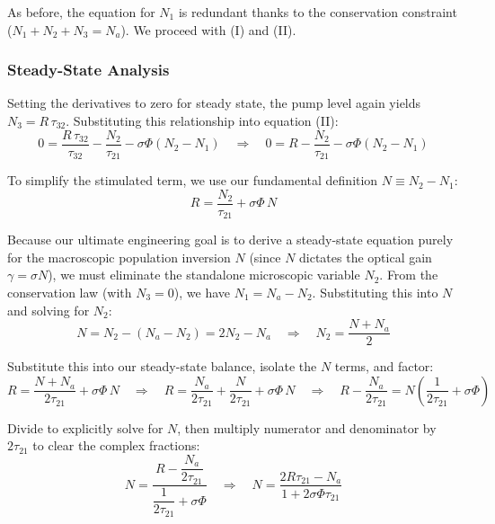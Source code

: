 As before, the equation for $N_1$ is redundant thanks to the conservation constraint ($N_1 + N_2 + N_3 = N_a$). We proceed with \textup{(I)} and \textup{(II)}.

\subsubsection*{Steady-State Analysis}

Setting the derivatives to zero for steady state, the pump level again yields $N_3 = R\,\tau_{32}$. Substituting this relationship into equation \textup{(II)}:
\begin{equation*}
    0 = \frac{R\,\tau_{32}}{\tau_{32}} - \frac{N_2}{\tau_{21}} - \sigma\Phi(N_2 - N_1) \quad \Longrightarrow \quad 0 = R - \frac{N_2}{\tau_{21}} - \sigma\Phi(N_2 - N_1)
\end{equation*}

To simplify the stimulated term, we use our fundamental definition $N \equiv N_2 - N_1$:
\begin{equation*}
    R = \frac{N_2}{\tau_{21}} + \sigma\Phi\,N
\end{equation*}

Because our ultimate engineering goal is to derive a steady-state equation purely for the macroscopic population inversion $N$ (since $N$ dictates the optical gain $\gamma = \sigma N$), we must eliminate the standalone microscopic variable $N_2$. From the conservation law (with $N_3 = 0$), we have $N_1 = N_a - N_2$. Substituting this into $N$ and solving for $N_2$:
\begin{equation*}
    N = N_2 - (N_a - N_2) = 2N_2 - N_a \quad \Longrightarrow \quad N_2 = \frac{N + N_a}{2}
\end{equation*}

Substitute this into our steady-state balance, isolate the $N$ terms, and factor:
\begin{equation*}
    R = \frac{N + N_a}{2\tau_{21}} + \sigma\Phi\,N \quad \Longrightarrow \quad R = \frac{N_a}{2\tau_{21}} + \frac{N}{2\tau_{21}} + \sigma\Phi\,N \quad \Longrightarrow \quad R - \frac{N_a}{2\tau_{21}} = N\!\left(\frac{1}{2\tau_{21}} + \sigma\Phi\right)
\end{equation*}

Divide to explicitly solve for $N$, then multiply numerator and denominator by $2\tau_{21}$ to clear the complex fractions:
\begin{equation*}
    N = \frac{R - \dfrac{N_a}{2\tau_{21}}}{\dfrac{1}{2\tau_{21}} + \sigma\Phi} \quad \Longrightarrow \quad N = \frac{2R\tau_{21} - N_a}{1 + 2\sigma\Phi\tau_{21}}
\end{equation*}

